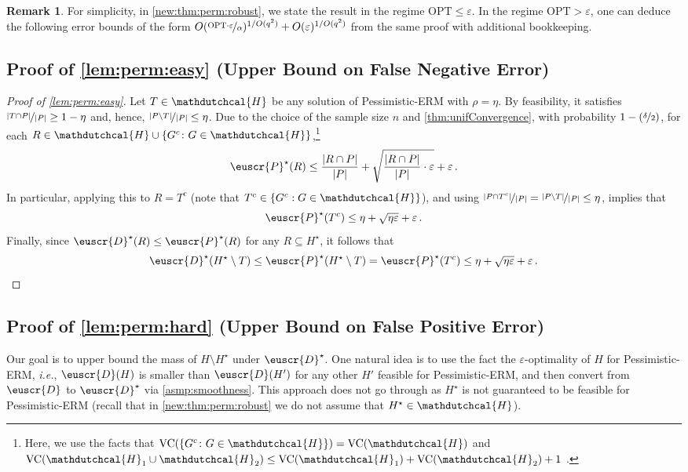 \documentclass[11pt]{article}
\theoremstyle{plain}
\theoremstyle{definition}
\newtheorem{remark}[theorem]{Remark}
\theoremstyle{remark}
\def\abs#1{\left| #1 \right|}
\newcommand{\inbrace}[1]{\left\{#1\right\}}
\newcommand{\inparen}[1]{\left(#1\right)}
\newcommand{\nfrac}[2]{\nicefrac{#1}{#2}}
\newcommand{\opt}{\ensuremath{\mathrm{OPT}}}
\newcommand{\vc}{\textrm{\rm VC}}
\newcommand{\eps}{\varepsilon}
\newcommand{\customcal}[1]{\euscr{#1}}
\newcommand{\cD}{\customcal{D}}
\newcommand{\cP}{\customcal{P}}
\newcommand{\ie}{\textit{i.e.}}
\newcommand{\hypo}[1]{\mathdutchcal{#1}}
\newcommand{\hyH}{\hypo{H}}
\newcommand{\pERM}{Pessimistic-ERM}
\newcommand{\optset}{{H^\star}}
\newcommand{\cDtrue}{\cD^\star}
\newcommand{\cDgiven}{\cD}
\newcommand{\cPtrue}{\cP^\star}
\begin{document}
        \begin{remark}
            For simplicity, in \cref{new:thm:perm:robust}, we state the result in the regime $\opt\leq\eps$. %
            In the regime $\opt > \eps$,  one can deduce the following error bounds of the form $O(\nfrac{\opt\cdot \eps}{\alpha})^{1/O(q^2)} + O(\eps)^{1/O(q^2)}$ from the same proof with additional bookkeeping.
        \end{remark}
        
        \subsection{Proof of \cref{lem:perm:easy} (Upper Bound on False Negative Error)}
        \begin{proof}[Proof of \cref{lem:perm:easy}]
            Let $T\in\hyH$ be any solution of \pERM{} with $\rho=\eta$. By feasibility, it satisfies $\nfrac{\abs{ T \cap P}}{\abs{P}}\geq 1- \eta $ and, hence, $\nfrac{\abs{ P\setminus T}}{\abs{P}}\leq \eta$.
            Due to the choice of the sample size $n$ and \cref{thm:unifConvergence}, with probability $1-\inparen{\nfrac{\delta}{2}}$, for each $R\in \hyH\cup \inbrace{G^c\colon G\in \hyH}$,\footnote{Here, we use the facts that $\vc{(\inbrace{G^c\colon G\in \hyH})}=\vc{(\hyH)}$ and $\vc{(\hyH_1\cup\hyH_2)}\leq {\vc{(\hyH_1)}+\vc{(\hyH_2)}+1}$ \cite{mohri2018foundations}.}
            \[
                \cPtrue(R) 
                \leq 
                \frac{\abs{R\cap P}}{\abs{P}}
                +
                \sqrt{\frac{\abs{R\cap P}}{\abs{P}}\cdot \eps}
                + \eps\,.
            \]
            In particular, applying this to $R=T^c$ (note that $T^c\in\{G^c: G\in \hyH\}$), and using $\nfrac{\abs{ P\cap T^c}}{\abs{P}}=\nfrac{\abs{ P\setminus T}}{\abs{P}}\leq \eta$, implies that 
            \[
                \cPtrue(T^c) \leq \eta+\sqrt{\eta\eps}+\eps\,.
            \]
            Finally, since $\cDtrue( R )\leq \cPtrue( R )$ for any $ R \subseteq \optset$, it follows that 
            \[
                \cDtrue(\optset\setminus  T )
                \leq \cPtrue(\optset\setminus  T )
                = \cPtrue(T^c)
                \leq  \eta +\sqrt{\eta\eps}+\eps\,.
            \]  
        \end{proof}


        
        \subsection{Proof of \cref{lem:perm:hard} {(Upper Bound on False Positive Error)}}
            Our goal is to upper bound the mass of $H\setminus \optset$ under $\cDtrue$. 
            One natural idea is to use the fact the $\eps$-optimality of $H$ for \pERM{}, \ie{},  $\cDgiven(H)$ is smaller than $\cD(H')$ for any other $H'$ feasible for \pERM{}, and then convert from $\cDgiven$ to $
            \cDtrue$ via \cref{asmp:smoothness}.
            This approach does not go through as $\optset$ is not guaranteed to be feasible for \pERM{} (recall that in \cref{new:thm:perm:robust} we do not assume that $\optset\in \hyH$). %
            
\end{document}
